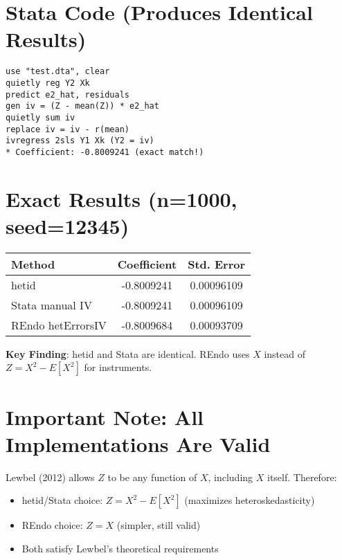 \documentclass[11pt]{article}
\begin{document}
\section*{Stata Code (Produces Identical Results)}

\begin{verbatim}
use "test.dta", clear
quietly reg Y2 Xk
predict e2_hat, residuals
gen iv = (Z - mean(Z)) * e2_hat
quietly sum iv
replace iv = iv - r(mean)
ivregress 2sls Y1 Xk (Y2 = iv)
* Coefficient: -0.8009241 (exact match!)
\end{verbatim}

\section*{Exact Results (n=1000, seed=12345)}

\begin{table}[h]
\centering
\begin{tabular}{lcc}
\toprule
Method & Coefficient & Std. Error \\
\midrule
hetid & -0.8009241 & 0.00096109 \\
Stata manual IV & -0.8009241 & 0.00096109 \\
REndo hetErrorsIV & -0.8009684 & 0.00093709 \\
\bottomrule
\end{tabular}
\end{table}

\textbf{Key Finding}: hetid and Stata are identical. REndo uses $X$ instead of $Z = X^2 - E[X^2]$ for instruments.

\section*{Important Note: All Implementations Are Valid}

Lewbel (2012) allows $Z$ to be any function of $X$, including $X$ itself. Therefore:
\begin{itemize}
\item hetid/Stata choice: $Z = X^2 - E[X^2]$ (maximizes heteroskedasticity)
\item REndo choice: $Z = X$ (simpler, still valid)
\item Both satisfy Lewbel's theoretical requirements
\end{itemize}
\end{document}
